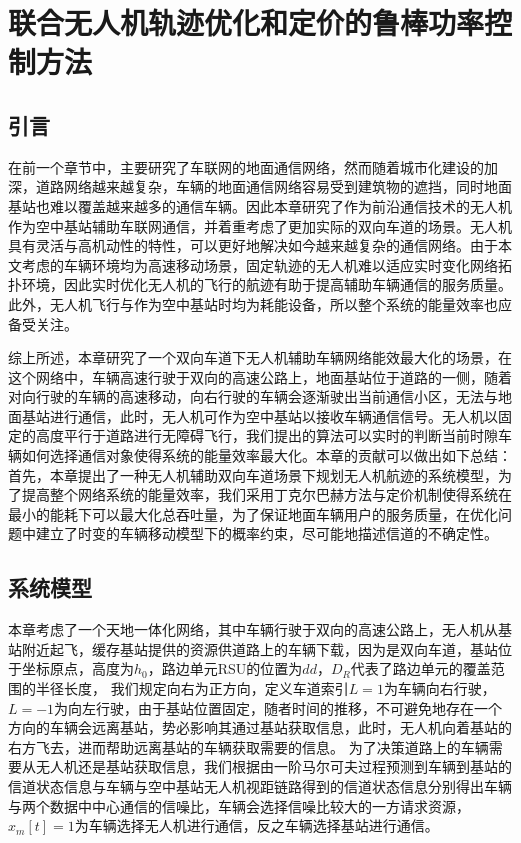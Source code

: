 \chapter{联合无人机轨迹优化和定价的鲁棒功率控制方法}

\label{chap:table}
\section{引言}\label{section4-1}
\label{chap:introduction}
在前一个章节中，主要研究了车联网的地面通信网络，然而随着城市化建设的加深，道路网络越来越复杂，车辆的地面通信网络容易受到建筑物的遮挡，同时地面基站也难以覆盖越来越多的通信车辆。因此本章研究了作为前沿通信技术的无人机作为空中基站辅助车联网通信，并着重考虑了更加实际的双向车道的场景。无人机具有灵活与高机动性的特性，可以更好地解决如今越来越复杂的通信网络。由于本文考虑的车辆环境均为高速移动场景，固定轨迹的无人机难以适应实时变化网络拓扑环境，因此实时优化无人机的飞行的航迹有助于提高辅助车辆通信的服务质量。此外，无人机飞行与作为空中基站时均为耗能设备，所以整个系统的能量效率也应备受关注。

综上所述，本章研究了一个双向车道下无人机辅助车辆网络能效最大化的场景，在这个网络中，车辆高速行驶于双向的高速公路上，地面基站位于道路的一侧，随着对向行驶的车辆的高速移动，向右行驶的车辆会逐渐驶出当前通信小区，无法与地面基站进行通信，此时，无人机可作为空中基站以接收车辆通信信号。无人机以固定的高度平行于道路进行无障碍飞行，我们提出的算法可以实时的判断当前时隙车辆如何选择通信对象使得系统的能量效率最大化。本章的贡献可以做出如下总结：首先，本章提出了一种无人机辅助双向车道场景下规划无人机航迹的系统模型，为了提高整个网络系统的能量效率，我们采用丁克尔巴赫方法与定价机制使得系统在最小的能耗下可以最大化总吞吐量，为了保证地面车辆用户的服务质量，在优化问题中建立了时变的车辆移动模型下的概率约束，尽可能地描述信道的不确定性。
\section{系统模型}\label{section4-2}
本章考虑了一个天地一体化网络，其中车辆行驶于双向的高速公路上，无人机从基站附近起飞，缓存基站提供的资源供道路上的车辆下载，因为是双向车道，基站位于坐标原点，高度为$h_0$，路边单元RSU的位置为$dd$，$D_R$代表了路边单元的覆盖范围的半径长度，
我们规定向右为正方向，定义车道索引$L=1$为车辆向右行驶，$L=-1$为向左行驶，由于基站位置固定，随者时间的推移，不可避免地存在一个方向的车辆会远离基站，势必影响其通过基站获取信息，此时，无人机向着基站的右方飞去，进而帮助远离基站的车辆获取需要的信息。
为了决策道路上的车辆需要从无人机还是基站获取信息，我们根据由一阶马尔可夫过程预测到车辆到基站的信道状态信息与车辆与空中基站无人机视距链路得到的信道状态信息分别得出车辆与两个数据中中心通信的信噪比，车辆会选择信噪比较大的一方请求资源，$x_m\left[t\right]=1$为车辆选择无人机进行通信，反之车辆选择基站进行通信。

